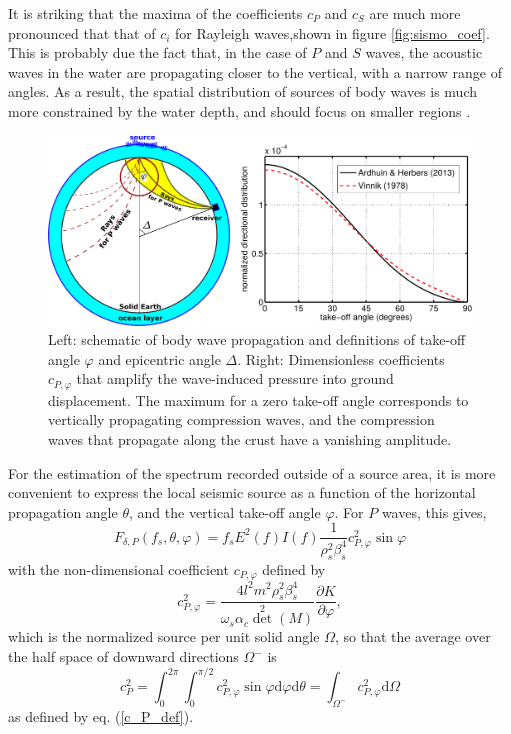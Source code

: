 It is striking that the maxima of the coefficients $c_P$ and $c_S$ are much more pronounced that that of $c_i$ for Rayleigh waves,shown in figure \ref{fig:sismo_coef}. This is probably due 
the fact that, in  the case of $P$ and $S$ waves, the acoustic waves in the water are propagating closer to the vertical, with a narrow range of angles.  As a result, the spatial distribution 
of sources of body waves is much more constrained by the water depth, and should focus on smaller regions \citep{Obrebski&al.2013}. 
\begin{figure}
\centerline{\includegraphics[width=\linewidth]{FIGS_CH_SISMO/C_P_phi.pdf}}
  \caption{Left: schematic of body wave propagation and definitions of take-off angle $\varphi$ and epicentric angle $\Delta$. Right: Dimensionless coefficients  $c_{P,\varphi}$ that amplify the wave-induced pressure into ground displacement. The 
maximum for a zero take-off angle corresponds to vertically propagating compression waves, and the compression waves that propagate 
along the crust have a vanishing amplitude.}
\label{fig:sismo_coef_CPphi}
\end{figure}

For the estimation of the spectrum recorded outside of a source area, it is more convenient to 
express the local seismic source as a function of the horizontal propagation angle $\theta$, and the vertical take-off angle 
$\varphi$. For $P$ waves, this gives, 
\begin{equation}
F_{\delta,P}(f_s,\theta,\varphi)= f_s   E^2(f)I(f)  \frac{1}{\rho_s^2 \beta_s^4 } c_{P,\varphi}^2 \sin \varphi
\label{eq:P_wave_at_source}
\end{equation}
with the non-dimensional coefficient $c_{P,\varphi}$ defined by 
\begin{equation}
c_{P,\varphi}^2=
\frac{4 l^2 m^2  \rho_s^2 \beta_s^4}{\omega_s \alpha_c  \det^2 (M)}\frac{\partial K}{\partial \varphi}, 
\end{equation}
which is the normalized source per unit solid angle $\Omega$, so that the average over the half space of downward directions 
${\Omega^-}$ is
\begin{equation}
c_P^2 = \int_0^{2 \pi} \int_0^{\pi/2} c_{P,\varphi}^2 \sin \varphi {\mathrm d} \varphi  {\mathrm d}\theta  =  \int_{\Omega^-} c_{P,\varphi}^2  {\mathrm d} \Omega
\end{equation}
as defined by eq. (\ref{c_P_def}). 

